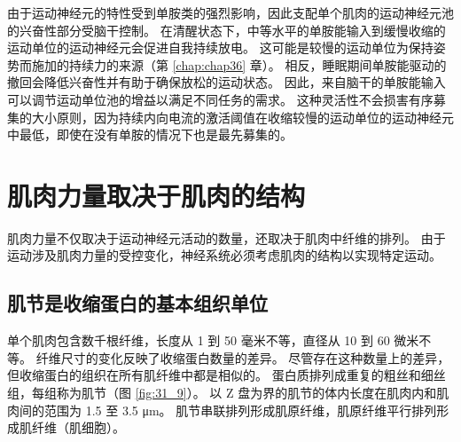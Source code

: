 由于运动神经元的特性受到单胺类的强烈影响，因此支配单个肌肉的运动神经元池的兴奋性部分受脑干控制。 在清醒状态下，中等水平的单胺能输入到缓慢收缩的运动单位的运动神经元会促进自我持续放电。 这可能是较慢的运动单位为保持姿势而施加的持续力的来源（第 \ref{chap:chap36} 章）。 相反，睡眠期间单胺能驱动的撤回会降低兴奋性并有助于确保放松的运动状态。 因此，来自脑干的单胺能输入可以调节运动单位池的增益以满足不同任务的需求。 这种灵活性不会损害有序募集的大小原则，因为持续内向电流的激活阈值在收缩较慢的运动单位的运动神经元中最低，即使在没有单胺的情况下也是最先募集的。


\section{肌肉力量取决于肌肉的结构}
肌肉力量不仅取决于运动神经元活动的数量，还取决于肌肉中纤维的排列。 由于运动涉及肌肉力量的受控变化，神经系统必须考虑肌肉的结构以实现特定运动。

\subsection{肌节是收缩蛋白的基本组织单位}
单个肌肉包含数千根纤维，长度从 1 到 50 毫米不等，直径从 10 到 60 微米不等。 纤维尺寸的变化反映了收缩蛋白数量的差异。 尽管存在这种数量上的差异，但收缩蛋白的组织在所有肌纤维中都是相似的。 
蛋白质排列成重复的粗丝和细丝组，每组称为肌节（图 \ref{fig:31_9}）。 
以 Z 盘为界的肌节的体内长度在肌肉内和肌肉间的范围为 1.5 至 3.5 μm。 肌节串联排列形成肌原纤维，肌原纤维平行排列形成肌纤维（肌细胞）。



